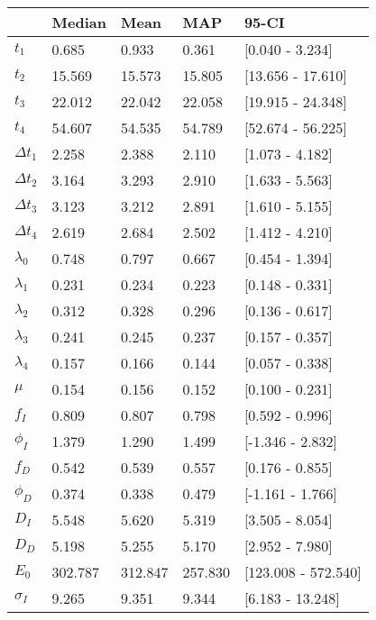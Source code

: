 \begin{tabular}{lllll}
\toprule
{} &   Median &     Mean &      MAP &                95-CI \\
\midrule
$t_1$        &    0.685 &    0.933 &    0.361 &      [0.040 - 3.234] \\
$t_2$        &   15.569 &   15.573 &   15.805 &    [13.656 - 17.610] \\
$t_3$        &   22.012 &   22.042 &   22.058 &    [19.915 - 24.348] \\
$t_4$        &   54.607 &   54.535 &   54.789 &    [52.674 - 56.225] \\
$\Delta t_1$ &    2.258 &    2.388 &    2.110 &      [1.073 - 4.182] \\
$\Delta t_2$ &    3.164 &    3.293 &    2.910 &      [1.633 - 5.563] \\
$\Delta t_3$ &    3.123 &    3.212 &    2.891 &      [1.610 - 5.155] \\
$\Delta t_4$ &    2.619 &    2.684 &    2.502 &      [1.412 - 4.210] \\
$\lambda_0$  &    0.748 &    0.797 &    0.667 &      [0.454 - 1.394] \\
$\lambda_1$  &    0.231 &    0.234 &    0.223 &      [0.148 - 0.331] \\
$\lambda_2$  &    0.312 &    0.328 &    0.296 &      [0.136 - 0.617] \\
$\lambda_3$  &    0.241 &    0.245 &    0.237 &      [0.157 - 0.357] \\
$\lambda_4$  &    0.157 &    0.166 &    0.144 &      [0.057 - 0.338] \\
$\mu$        &    0.154 &    0.156 &    0.152 &      [0.100 - 0.231] \\
$f_I$        &    0.809 &    0.807 &    0.798 &      [0.592 - 0.996] \\
$\phi_I$     &    1.379 &    1.290 &    1.499 &     [-1.346 - 2.832] \\
$f_D$        &    0.542 &    0.539 &    0.557 &      [0.176 - 0.855] \\
$\phi_D$     &    0.374 &    0.338 &    0.479 &     [-1.161 - 1.766] \\
$D_I$        &    5.548 &    5.620 &    5.319 &      [3.505 - 8.054] \\
$D_D$        &    5.198 &    5.255 &    5.170 &      [2.952 - 7.980] \\
$E_0$        &  302.787 &  312.847 &  257.830 &  [123.008 - 572.540] \\
$\sigma_I$   &    9.265 &    9.351 &    9.344 &     [6.183 - 13.248] \\

\end{tabular}
